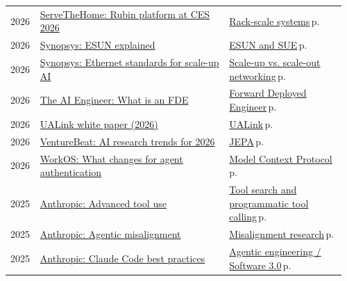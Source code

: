 \documentclass[10pt,a4paper,openany]{report}
\begin{document}
{\begin{longtable}{@{}p{0.07\linewidth}>{\raggedright}p{0.55\linewidth}>{\raggedright\arraybackslash}p{0.34\linewidth}@{}}
2026 & \href{https://www.servethehome.com/nvidia-launches-next-generation-rubin-ai-compute-platform-at-ces-2026/}{ServeTheHome: Rubin platform at CES 2026} & \hyperref[c:hardware-0]{Rack-scale systems}\,{\color{muted}\scriptsize p.\,\pageref{c:hardware-0}}\\
2026 & \href{https://www.synopsys.com/blogs/chip-design/esun-ethernet-ai-scale-up-networking.html}{Synopsys: ESUN explained} & \hyperref[c:hardware-4]{ESUN and SUE}\,{\color{muted}\scriptsize p.\,\pageref{c:hardware-4}}\\
2026 & \href{https://www.synopsys.com/articles/ethernet-standards-scale-up-ai.html}{Synopsys: Ethernet standards for scale-up AI} & \hyperref[c:hardware-2]{Scale-up vs. scale-out networking}\,{\color{muted}\scriptsize p.\,\pageref{c:hardware-2}}\\
2026 & \href{https://theaiengineer.substack.com/p/what-is-a-forward-deployed-engineer}{The AI Engineer: What is an FDE} & \hyperref[c:practice-0]{Forward Deployed Engineer}\,{\color{muted}\scriptsize p.\,\pageref{c:practice-0}}\\
2026 & \href{https://ualinkconsortium.org/wp-content/uploads/2026/01/UALink_White_Paper_Publication_Candidate_FINAL_VERSION.pdf}{UALink white paper (2026)} & \hyperref[c:hardware-3]{UALink}\,{\color{muted}\scriptsize p.\,\pageref{c:hardware-3}}\\
2026 & \href{https://venturebeat.com/technology/four-ai-research-trends-enterprise-teams-should-watch-in-2026}{VentureBeat: AI research trends for 2026} & \hyperref[c:embodied-3]{JEPA}\,{\color{muted}\scriptsize p.\,\pageref{c:embodied-3}}\\
2026 & \href{https://workos.com/blog/mcp-2026-spec-agent-authentication}{WorkOS: What changes for agent authentication} & \hyperref[c:protocols-0]{Model Context Protocol}\,{\color{muted}\scriptsize p.\,\pageref{c:protocols-0}}\\
2025 & \href{https://www.anthropic.com/engineering/advanced-tool-use}{Anthropic: Advanced tool use} & \hyperref[c:agents-6]{Tool search and programmatic tool calling}\,{\color{muted}\scriptsize p.\,\pageref{c:agents-6}}\\
2025 & \href{https://www.anthropic.com/research/agentic-misalignment}{Anthropic: Agentic misalignment} & \hyperref[c:safety-9]{Misalignment research}\,{\color{muted}\scriptsize p.\,\pageref{c:safety-9}}\\
2025 & \href{https://www.anthropic.com/engineering/claude-code-best-practices}{Anthropic: Claude Code best practices} & \hyperref[c:coding-2]{Agentic engineering / Software 3.0}\,{\color{muted}\scriptsize p.\,\pageref{c:coding-2}}\\

\end{longtable}}
\end{document}
